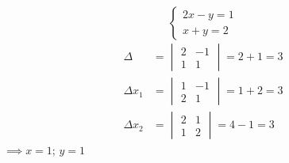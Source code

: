 \documentclass[12pt, a4paper]{article}
\begin{document}
    \begin{exmp}
        \[
            \begin{cases}
                2x - y = 1 \\
                x + y = 2
            \end{cases}
        \] 
        \begin{align*}
            \Delta &= \begin{vmatrix}
                2 & -1 \\ 1 & 1
            \end{vmatrix} = 2 + 1 = 3 \\
                \Delta x_{1} &= \begin{vmatrix}
                1 & -1 \\ 2 & 1
            \end{vmatrix} = 1 + 2 = 3 \\
                    \Delta x_{2} &= \begin{vmatrix}
                2 & 1 \\ 1 & 2
            \end{vmatrix} = 4 - 1 = 3
        \end{align*} \( \implies x = 1;\,y = 1 \)
    \end{exmp}
\end{document}
